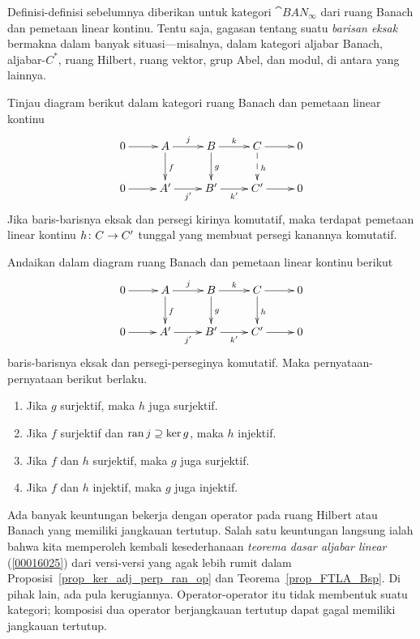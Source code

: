 Definisi-definisi sebelumnya diberikan untuk
kategori $\cat{BAN_\infty}$ dari ruang Banach dan pemetaan linear kontinu. Tentu saja,
gagasan tentang suatu \emph{barisan eksak} bermakna dalam banyak situasi---misalnya, dalam
kategori aljabar Banach, aljabar-$C^*$, ruang Hilbert, ruang vektor, grup Abel,
dan modul, di antara yang lainnya.

\begin{prop}\label{00151231} Tinjau diagram berikut dalam kategori ruang Banach
dan pemetaan linear kontinu
 \[\xymatrix{
      0\ar[r] & A\ar[d]^f\ar[r]^j & B\ar[d]^g\ar[r]^k
              & C\ar@{-->}[d]^h \ar[r] & 0 \\
      0\ar[r] & A'\ar[r]_{j'} & B'\ar[r]_{k'}
      & C'\ar[r] & 0
 }\]
Jika baris-barisnya eksak dan persegi kirinya komutatif, maka terdapat pemetaan linear kontinu
$h\colon C \rightarrow C'$ tunggal yang membuat persegi kanannya komutatif.
\end{prop}

\begin{prop}\label{00151232}
Andaikan dalam diagram ruang Banach dan pemetaan linear kontinu berikut
 \[\xymatrix{
      0\ar[r] & A\ar[d]^f\ar[r]^j & B\ar[d]^g\ar[r]^k
              & C\ar[d]^h \ar[r] & 0 \\
      0\ar[r] & A'\ar[r]_{j'} & B'\ar[r]_{k'}
      & C'\ar[r] & 0
 }\]
baris-barisnya eksak dan persegi-perseginya komutatif. Maka pernyataan-pernyataan berikut berlaku.
 \begin{enumerate}[label=\rm{(\alph*)}]
  \item Jika $g$ surjektif, maka $h$ juga surjektif.
  \item Jika $f$ surjektif dan $\operatorname{ran} j \supseteq \ker g$, maka $h$ injektif.
  \item Jika $f$ dan $h$ surjektif, maka $g$ juga surjektif.
  \item Jika $f$ dan $h$ injektif, maka $g$ juga injektif.
 \end{enumerate}
\end{prop}

Ada banyak keuntungan bekerja dengan operator pada ruang Hilbert atau Banach yang memiliki jangkauan tertutup.
Salah satu keuntungan langsung ialah bahwa kita memperoleh kembali kesederhanaan \emph{teorema dasar aljabar linear}
(\ref{00016025}) dari versi-versi yang agak lebih rumit dalam Proposisi~\ref{prop_ker_adj_perp_ran_op}
dan Teorema~\ref{prop_FTLA_Bsp}. Di pihak lain, ada pula kerugiannya. Operator-operator itu tidak membentuk suatu kategori; komposisi
dua operator berjangkauan tertutup dapat gagal memiliki jangkauan tertutup.


